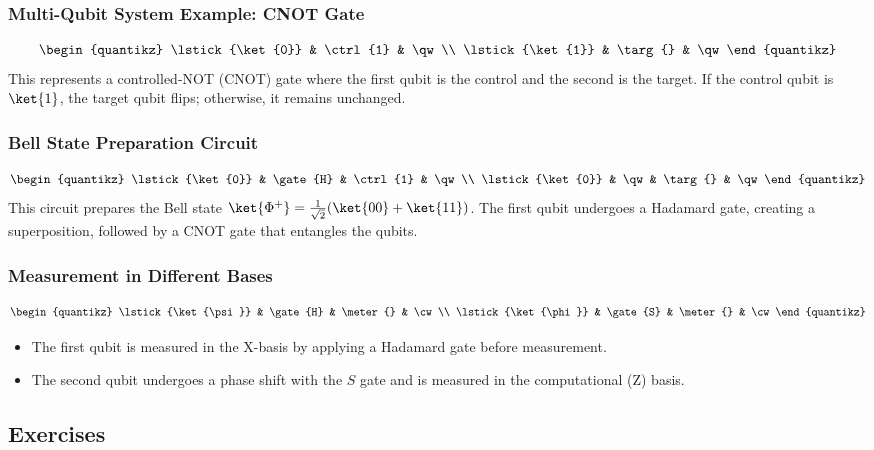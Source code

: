 \subsubsection*{Multi-Qubit System Example: CNOT Gate}
\[
\begin{quantikz}
    \lstick{\ket{0}} & \ctrl{1} & \qw \\
    \lstick{\ket{1}} & \targ{}  & \qw
\end{quantikz}
\]
This represents a controlled-NOT (CNOT) gate where the first qubit is the
control and the second is the target. If the control qubit is $\ket{1}$, the
target qubit flips; otherwise, it remains unchanged.

\subsubsection*{Bell State Preparation Circuit}
\[
\begin{quantikz}
    \lstick{\ket{0}} & \gate{H} & \ctrl{1} & \qw \\
    \lstick{\ket{0}} & \qw      & \targ{}  & \qw
\end{quantikz}
\]
This circuit prepares the Bell state $\ket{\Phi^+} =
\frac{1}{\sqrt{2}}(\ket{00} + \ket{11})$. The first qubit undergoes a
Hadamard gate, creating a superposition, followed by a CNOT gate that
entangles the qubits.

\subsubsection*{Measurement in Different Bases}
\[
\begin{quantikz}
    \lstick{\ket{\psi}} & \gate{H} & \meter{} & \cw \\
    \lstick{\ket{\phi}} & \gate{S} & \meter{} & \cw
\end{quantikz}
\]

\begin{itemize}
  \item The first qubit is measured in the X-basis by applying a Hadamard
    gate before measurement.
  \item The second qubit undergoes a phase shift with the $S$ gate and is
    measured in the computational (Z) basis.
\end{itemize}

\vspace{0.3cm}

\subsection*{Exercises}

